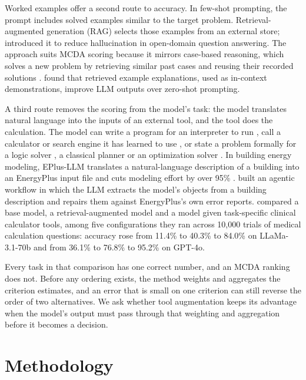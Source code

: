\documentclass[final,3p,times]{elsarticle}
\begin{document}
Worked examples offer a second route to accuracy. In few-shot prompting, the prompt includes solved examples similar to the target problem. Retrieval-augmented generation (RAG) selects those examples from an external store; \citet{lewis2020} introduced it to reduce hallucination in open-domain question answering. The approach suits MCDA scoring because it mirrors case-based reasoning, which solves a new problem by retrieving similar past cases and reusing their recorded solutions \cite{aamodtplaza1994}. \citet{minorkaucher2024} found that retrieved example explanations, used as in-context demonstrations, improve LLM outputs over zero-shot prompting.

A third route removes the scoring from the model's task: the model translates natural language into the inputs of an external tool, and the tool does the calculation. The model can write a program for an interpreter to run \cite{gao2023pal}, call a calculator or search engine it has learned to use \cite{schick2023toolformer}, or state a problem formally for a logic solver \cite{pan2023logiclm}, a classical planner \cite{liu2023llmp} or an optimization solver \cite{ramamonjison2023nl4opt,ahmaditeshnizi2024optimus}. In building energy modeling, EPlus-LLM translates a natural-language description of a building into an EnergyPlus input file and cuts modeling effort by over 95\% \cite{jiang2024eplus}. \citet{zhang2025agentic} built an agentic workflow in which the LLM extracts the model's objects from a building description and repairs them against EnergyPlus's own error reports. \citet{goodell2025} compared a base model, a retrieval-augmented model and a model given task-specific clinical calculator tools, among five configurations they ran across 10{,}000 trials of medical calculation questions: accuracy rose from 11.4\% to 40.3\% to 84.0\% on LLaMa-3.1-70b and from 36.1\% to 76.8\% to 95.2\% on GPT-4o.

Every task in that comparison has one correct number, and an MCDA ranking does not. Before any ordering exists, the method weights and aggregates the criterion estimates, and an error that is small on one criterion can still reverse the order of two alternatives. We ask whether tool augmentation keeps its advantage when the model's output must pass through that weighting and aggregation before it becomes a decision.

\section{Methodology}
\label{sec:methodology}
\end{document}
